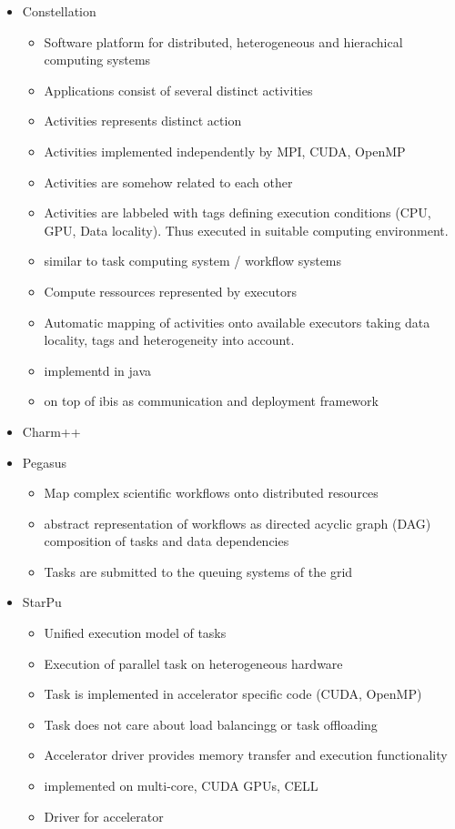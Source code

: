 \begin{itemize}
\item Constellation \cite{ref:constellation}
  \begin{itemize}
  \item Software platform for distributed, heterogeneous and hierachical computing
    systems
  \item Applications consist of several distinct activities
  \item Activities represents distinct action
  \item Activities implemented independently by MPI, CUDA, OpenMP 
  \item Activities are somehow related to each other
  \item Activities are labbeled with tags defining execution conditions
    (CPU, GPU, Data locality). Thus executed in suitable computing
    environment.
  \item similar to task computing system / workflow systems
  \item Compute ressources represented by executors
  \item Automatic mapping of activities onto available executors taking
    data locality, tags and heterogeneity into account.
  \item implementd in java
  \item on top of ibis as communication and deployment framework
  \end{itemize}
  
\item Charm++

\item Pegasus \cite{ref:pegasus}
  \begin{itemize}
  \item Map complex scientific workflows onto distributed resources
  \item abstract representation of workflows as directed acyclic graph (DAG)
    composition of tasks and data dependencies
  \item Tasks are submitted to the queuing systems of the grid
  \end{itemize}

\item StarPu 
  \begin{itemize}
  \item Unified execution model of tasks
  \item Execution of parallel task on heterogeneous hardware
  \item Task is implemented in accelerator specific code (CUDA, OpenMP)
  \item Task does not care about load balancingg or task offloading
  \item Accelerator driver provides memory transfer and execution functionality
  \item implemented on multi-core, CUDA GPUs, CELL
  \item Driver for accelerator
  \end{itemize}


\end{itemize}
